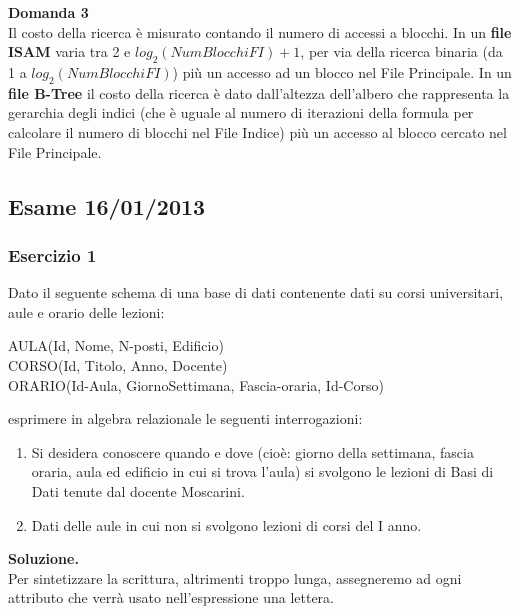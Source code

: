   \noindent\textbf{\fontsize{14pt}{1em}Domanda 3}\\
  Il costo della ricerca è misurato contando il numero di accessi a blocchi. In un \textbf{file ISAM} varia tra 2 e 
  $log_2(NumBlocchiFI) + 1$, per via della ricerca binaria (da 1 a $log_2(NumBlocchiFI)$) più un accesso ad un blocco
  nel File Principale. In un \textbf{file B-Tree} il costo della ricerca è dato dall'altezza dell'albero che rappresenta
  la gerarchia degli indici (che è uguale al numero di iterazioni della formula per calcolare il 
  numero di blocchi nel File Indice) più un accesso al blocco cercato nel File Principale.
  
  \subsection{Esame 16/01/2013}
  \subsubsection{Esercizio 1}
  Dato il seguente schema di una base di dati contenente dati su corsi universitari, aule e orario delle lezioni:
  \begin{center}
  AULA(Id, Nome, N-posti, Edificio)\\
  CORSO(Id, Titolo, Anno, Docente) \\
  ORARIO(Id-Aula, GiornoSettimana, Fascia-oraria, Id-Corso)\\ 
  \end{center}
  esprimere in algebra relazionale le seguenti interrogazioni:
  \begin{enumerate}
   \item Si desidera conoscere quando e dove (cioè: giorno della settimana, fascia oraria, aula ed edificio in cui 
   si trova l'aula) si svolgono le lezioni di Basi di Dati tenute dal docente Moscarini.
   \item Dati delle aule in cui non si svolgono lezioni di corsi del I anno.
  \end{enumerate}
  \noindent\textbf{\fontsize{14pt}{1em}Soluzione.}\\
  Per sintetizzare la scrittura, altrimenti troppo lunga, assegneremo ad ogni attributo che verrà usato
  nell'espressione una lettera.
  
